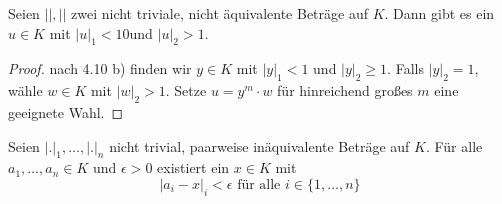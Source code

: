 \documentclass[../main.tex]{subfiles}
\begin{document}
\begin{corollary}
    Seien $||,||$ zwei nicht triviale, nicht äquivalente Beträge auf $K$. Dann gibt es ein $u\in K$ mit $|u|_1 < 1$0und $|u|_2 > 1$.
\end{corollary}
\begin{proof}
    nach 4.10 b) finden wir $y\in K$ mit $|y|_1 <1$ und $|y|_2\geq 1$.
     Falls $|y|_2 = 1$, wähle $w\in K$ mit $|w|_2>1$.
     Setze $u=y^m\cdot w$ für hinreichend großes $m$ eine geeignete Wahl.
\end{proof}

\begin{theorem}[Approximationssatz]
    Seien $|.|_1, \dots,|.|_n$ nicht trivial, paarweise inäquivalente Beträge auf $K$.
    Für alle $a_1,\dots, a_n\in K$ und $\epsilon > 0$ existiert ein $x\in K$ mit $$|a_i-x|_i <\epsilon \text{ für alle } i\in \{1,\dots,n\}$$
\end{theorem}
\end{document}

